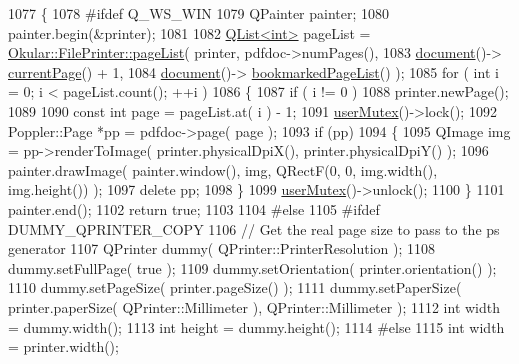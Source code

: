 \begin{DoxyCode}
1077 \{
1078 \textcolor{preprocessor}{#ifdef Q\_WS\_WIN}
1079     QPainter painter;
1080     painter.begin(&printer);
1081 
1082     \hyperlink{classQList}{QList<int>} pageList = \hyperlink{classOkular_1_1FilePrinter_aed485e5e3fbe591b16e15915e318a1b7}{Okular::FilePrinter::pageList}( printer, 
      pdfdoc->numPages(),
1083                                                          \hyperlink{classOkular_1_1Generator_a4248672ef04e62660d51f16c0a862bbe}{document}()->
      \hyperlink{classOkular_1_1Document_a42ec374d73794bf56d7e7b11f1f56319}{currentPage}() + 1,
1084                                                          \hyperlink{classOkular_1_1Generator_a4248672ef04e62660d51f16c0a862bbe}{document}()->
      \hyperlink{classOkular_1_1Document_a01de5a7212e14772e647a8e1caa07627}{bookmarkedPageList}() );
1085     \textcolor{keywordflow}{for} ( \textcolor{keywordtype}{int} i = 0; i < pageList.count(); ++i )
1086     \{
1087         \textcolor{keywordflow}{if} ( i != 0 )
1088             printer.newPage();
1089 
1090         \textcolor{keyword}{const} \textcolor{keywordtype}{int} page = pageList.at( i ) - 1;
1091         \hyperlink{classOkular_1_1Generator_a83d702cccbce2288c3258d97f1f15e19}{userMutex}()->lock();
1092         Poppler::Page *pp = pdfdoc->page( page );
1093         \textcolor{keywordflow}{if} (pp)
1094         \{
1095             QImage img = pp->renderToImage(  printer.physicalDpiX(), printer.physicalDpiY() );
1096             painter.drawImage( painter.window(), img, QRectF(0, 0, img.width(), img.height()) );
1097             \textcolor{keyword}{delete} pp;
1098         \}
1099         \hyperlink{classOkular_1_1Generator_a83d702cccbce2288c3258d97f1f15e19}{userMutex}()->unlock();
1100     \}
1101     painter.end();
1102     \textcolor{keywordflow}{return} \textcolor{keyword}{true};
1103 
1104 \textcolor{preprocessor}{#else}
1105 \textcolor{preprocessor}{#ifdef DUMMY\_QPRINTER\_COPY}
1106     \textcolor{comment}{// Get the real page size to pass to the ps generator}
1107     QPrinter dummy( QPrinter::PrinterResolution );
1108     dummy.setFullPage( \textcolor{keyword}{true} );
1109     dummy.setOrientation( printer.orientation() );
1110     dummy.setPageSize( printer.pageSize() );
1111     dummy.setPaperSize( printer.paperSize( QPrinter::Millimeter ), QPrinter::Millimeter );
1112     \textcolor{keywordtype}{int} width = dummy.width();
1113     \textcolor{keywordtype}{int} height = dummy.height();
1114 \textcolor{preprocessor}{#else}
1115     \textcolor{keywordtype}{int} width = printer.width();

\end{DoxyCode}

